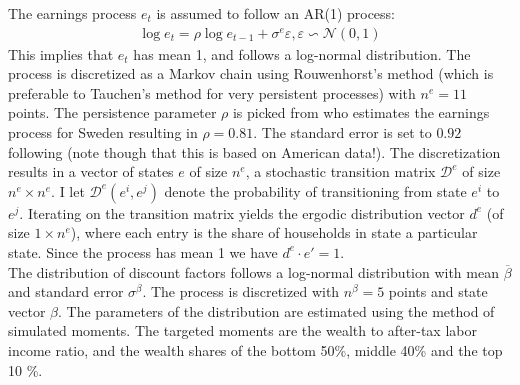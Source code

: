 The earnings process $e_t$ is assumed to follow an AR(1) process:
\begin{align*}
\log e_{t}=\rho\log e_{t-1}+\sigma^{e}\varepsilon, \varepsilon\backsim\mathcal{N}\left(0,1\right) 
\end{align*}
This implies that $e_t$ has mean 1, and follows a log-normal distribution. The process is discretized as a Markov chain using Rouwenhorst's method (which is preferable to Tauchen's method for very persistent processes) with $n^e=11$ points. The persistence parameter $\rho$ is picked from \citet{floden2001idiosyncratic} who estimates the earnings process for Sweden resulting in $\rho = 0.81$. The standard error is set to $0.92$ following \citet{kaplan2018monetary} (note though that this is based on American data!). The discretization results in a vector of states $e$ of size $n^e$, a stochastic transition matrix $\mathcal{D}^{e}$ of size $n^{e}\times n^{e}$. I let $\mathcal{D}^{e}\left(e^{i},e^{j}\right)$ denote the probability of transitioning from state $e^i$ to $e^j$. Iterating on the transition matrix yields the ergodic distribution vector $d^{e}$ (of size $1\times n^{e}$), where each entry is the share of households in state a particular state. Since the process has mean 1 we have $d^{e}\cdot e'=1$. \\

The distribution of discount factors follows a log-normal distribution with mean $\overline{\beta}$ and standard error $\sigma^{\beta}$. The process is discretized with $n^\beta=5$ points and state vector $\beta$. The parameters of the distribution are estimated using the method of simulated moments. The targeted moments are the wealth to after-tax labor income ratio, and the wealth shares of the bottom 50\%, middle 40\% and the top 10 \%. \\
 
